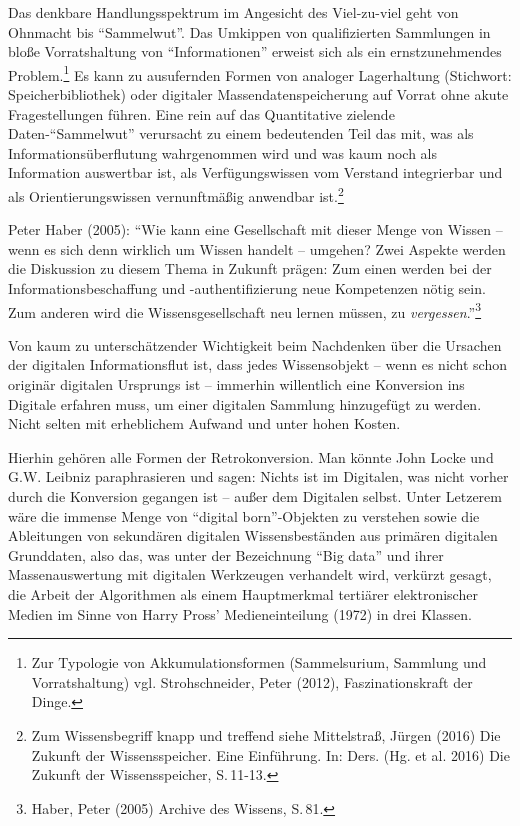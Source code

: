 \documentclass[a4paper,
fontsize=11pt,
oneside,
numbers=noperiodatend,
parskip=half-,
bibliography=totoc,
final
]{scrartcl}
\begin{document}
Das denkbare Handlungsspektrum im Angesicht des Viel-zu-viel geht von
Ohnmacht bis \enquote{Sammelwut}. Das Umkippen von qualifizierten
Sammlungen in bloße Vorratshaltung von \enquote{Informationen} erweist
sich als ein ernstzunehmendes Problem.\footnote{Zur Typologie von
  Akkumulationsformen (Sammelsurium, Sammlung und Vorratshaltung) vgl.
  Strohschneider, Peter (2012), Faszinationskraft der Dinge.} Es kann zu
ausufernden Formen von analoger Lagerhaltung (Stichwort:
Speicherbibliothek) oder digitaler Massendatenspeicherung auf Vorrat
ohne akute Fragestellungen führen. Eine rein auf das Quantitative
zielende Daten-\enquote{Sammelwut} verursacht zu einem bedeutenden Teil
das mit, was als Informationsüberflutung wahrgenommen wird und was kaum
noch als Information auswertbar ist, als Verfügungswissen vom Verstand
integrierbar und als Orientierungswissen vernunftmäßig anwendbar
ist.\footnote{Zum Wissensbegriff knapp und treffend siehe Mittelstraß,
  Jürgen (2016) Die Zukunft der Wissensspeicher. Eine Einführung. In:
  Ders. (Hg. et al. 2016) Die Zukunft der Wissensspeicher, S.\,11-13.}

Peter Haber (2005): \enquote{Wie kann eine Gesellschaft mit dieser Menge
von Wissen -- wenn es sich denn wirklich um Wissen handelt -- umgehen?
Zwei Aspekte werden die Diskussion zu diesem Thema in Zukunft prägen:
Zum einen werden bei der Informationsbeschaffung und -authent\-ifizierung
neue Kompetenzen nötig sein. Zum anderen wird die Wissensgesellschaft
neu lernen müssen, zu \emph{vergessen}.}\footnote{Haber, Peter (2005)
  Archive des Wissens, S.\,81.}

Von kaum zu unterschätzender Wichtigkeit beim Nachdenken über die
Ursachen der digitalen Informationsflut ist, dass jedes Wissensobjekt --
wenn es nicht schon originär digitalen Ursprungs ist -- immerhin
willentlich eine Konversion ins Digitale erfahren muss, um einer
digitalen Sammlung hinzugefügt zu werden. Nicht selten mit erheblichem
Aufwand und unter hohen Kosten.

Hierhin gehören alle Formen der Retrokonversion. Man könnte John Locke
und G.W. Leibniz paraphrasieren und sagen: Nichts ist im Digitalen, was
nicht vorher durch die Konversion gegangen ist -- außer dem Digitalen
selbst. Unter Letzerem wäre die immense Menge von \enquote{digital
born}-Objekten zu verstehen sowie die Ableitungen von sekundären
digitalen Wissensbeständen aus primären digitalen Grunddaten, also das,
was unter der Bezeichnung \enquote{Big data} und ihrer Massenauswertung
mit digitalen Werkzeugen verhandelt wird, verkürzt gesagt, die Arbeit
der Algorithmen als einem Hauptmerkmal tertiärer elektronischer Medien
im Sinne von Harry Pross' Medieneinteilung (1972) in drei Klassen.
\end{document}
